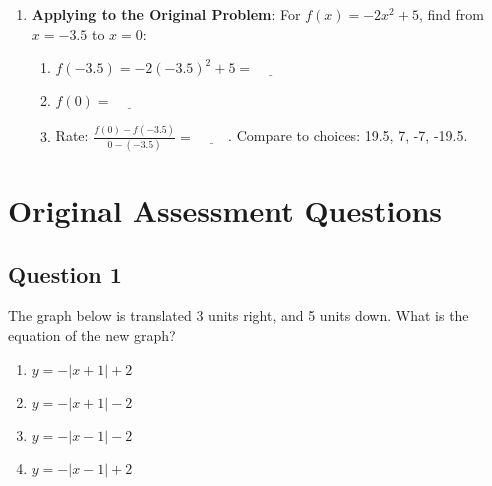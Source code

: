 \documentclass[12pt]{article}
\begin{document}
\begin{enumerate}[label=12.\arabic*]
\begin{enumerate}[label=\alph*)]
    \end{enumerate}
    \item \textbf{Applying to the Original Problem}: For \( f(x) = -2x^2 + 5 \), find from \( x = -3.5 \) to \( x = 0 \):
    \begin{enumerate}[label=\alph*)]
        \item \( f(-3.5) = -2(-3.5)^2 + 5 = \underline{\hspace{1cm}} \)
        \item \( f(0) = \underline{\hspace{1cm}} \)
        \item Rate: \( \frac{f(0) - f(-3.5)}{0 - (-3.5)} = \underline{\hspace{1cm}} \). Compare to choices: 19.5, 7, -7, -19.5.
    \end{enumerate}
\end{enumerate}


\section*{Original Assessment Questions}

\subsection*{Question 1}
The graph below is translated 3 units right, and 5 units down. What is the equation of the new graph?

\begin{center}
\end{center}

\begin{enumerate}[label=\Alph*.]
    \item \( y = -|x + 1| + 2 \)
    \item \( y = -|x + 1| - 2 \)
    \item \( y = -|x - 1| - 2 \)
    \item \( y = -|x - 1| + 2 \)
\end{enumerate}
\end{document}
